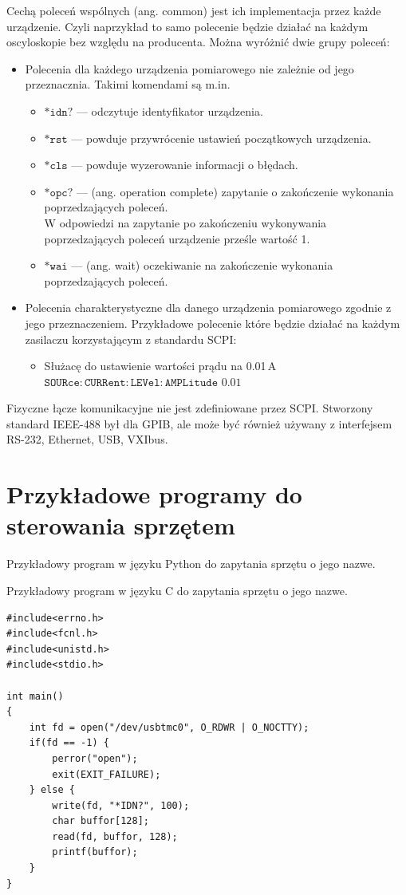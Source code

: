 \documentclass[a4paper, portrait,12pt]{mwrep}
\begin{document}
Cechą  poleceń  wspólnych  (ang.  common)  jest  ich  implementacja  przez  każde urządzenie. Czyli naprzykład to samo polecenie będzie działać na każdym oscyloskopie bez względu na producenta. Można wyróżnić dwie grupy poleceń:
\begin{itemize}
\item Polecenia dla każdego urządzenia pomiarowego nie zależnie od jego przeznacznia. Takimi komendami są m.in.
\begin{itemize}
\item $\mathtt{*idn?}$ --- odczytuje identyfikator urządzenia. 
\item $\mathtt{*rst}$ --- powduje przywrócenie ustawień początkowych urządzenia.
\item $\mathtt{*cls}$ --- powduje wyzerowanie informacji o błędach.
\item $\mathtt{*opc?}$  --- (ang.  operation  complete)  zapytanie  o  zakończenie  wykonania
poprzedzających poleceń. \\
W  odpowiedzi  na  zapytanie  po  zakończeniu  wykonywania  poprzedzających poleceń urządzenie prześle wartość 1.
\item $\mathtt{*wai}$ ---  (ang.  wait)  oczekiwanie  na  zakończenie  wykonania  poprzedzających poleceń.
\end{itemize}

\item Polecenia charakterystyczne dla danego urządzenia pomiarowego zgodnie z jego przeznaczeniem. Przykładowe polecenie które będzie działać na każdym zasilaczu korzystającym z standardu SCPI:
\begin{itemize}
\item Służacę do ustawienie wartości prądu na 0.01\,A \\ $\mathtt{SOURce:CURRent:LEVel:AMPLitude}$  $\mathtt{0.01}$
\end{itemize}
\end{itemize}

Fizyczne łącze komunikacyjne nie jest zdefiniowane przez SCPI. Stworzony standard IEEE-488 był dla GPIB, ale może być również używany z interfejsem RS-232, Ethernet, USB, VXIbus.
\newpage
\section{Przykładowe programy do sterowania sprzętem}
Przykładowy program w języku Python do zapytania sprzętu o jego nazwe.

Przykładowy program w języku C do zapytania sprzętu o jego nazwe.
\begin{lstlisting}
#include<errno.h>
#include<fcnl.h>
#include<unistd.h>
#include<stdio.h>

int main()
{
    int fd = open("/dev/usbtmc0", O_RDWR | O_NOCTTY);
    if(fd == -1) {
        perror("open");
        exit(EXIT_FAILURE);
    } else {
        write(fd, "*IDN?", 100);
        char buffor[128];
        read(fd, buffor, 128);
        printf(buffor);
    }
}

\end{lstlisting}
\end{document}
